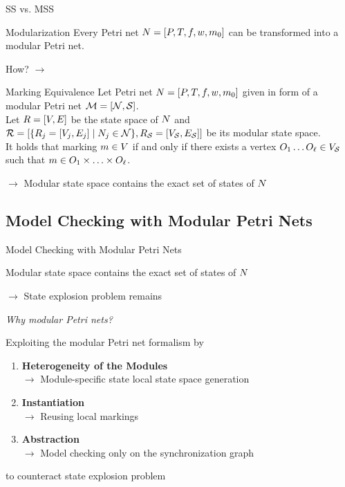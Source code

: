 \documentclass[11pt]{presentation}
\begin{document}

\begin{frame}{SS vs. MSS}

	\begin{merke}{Modularization}{}
		Every Petri net $ \pn[=] $ can be transformed into a modular Petri net.
	\end{merke}
	How? $ \rightarrow $ \cite{gaede_automatic_2024}

	\bigskip

	\begin{satz}{Marking Equivalence \cite{gaede_modular_2024}}{}
		Let Petri net $ \pn[=] $ given in form of a modular Petri net $ \ms[=] $.\\
		Let $ \ss[=] $ be the state space of $ \pn $ and $ \crazy{R} = [\set{\lss{j}[=] \mid \module{j} \in \modules}, R_{\synchronizations}=[V_{\synchronizations},E_{\synchronizations}]]$ be its modular state space.\\
		It holds that marking $ \marking \in V $
		if and only if there exists a vertex $ \segment[1] \dotsc \segment[\modulecard] \in V_{\synchronizations} $ such that $ \marking \in \segment[1] \times \dotsc \times \segment[\modulecard] $.
	\end{satz}
	$ \rightarrow $ Modular state space contains the exact set of states of $ \pn $ \smiley{}
\end{frame}

\subsection{Model Checking with Modular Petri Nets}

\begin{frame}{Model Checking with Modular Petri Nets}

	Modular state space contains the exact set of states of $ \pn $

	$ \rightarrow $ State explosion problem remains \frownie{}

	\bigskip
	\emph{Why modular Petri nets?}

	\medskip
	Exploiting the modular Petri net formalism by
	\begin{enumerate}
		\item \textbf{Heterogeneity of the Modules}\\
		      $ \rightarrow $ Module-specific state local state space generation
		\item \textbf{Instantiation}\\
		      $ \rightarrow $ Reusing local markings
		\item \textbf{Abstraction}\\
		      $ \rightarrow $ Model checking only on the synchronization graph
	\end{enumerate}
	to counteract state explosion problem
\end{frame}
\end{document}
